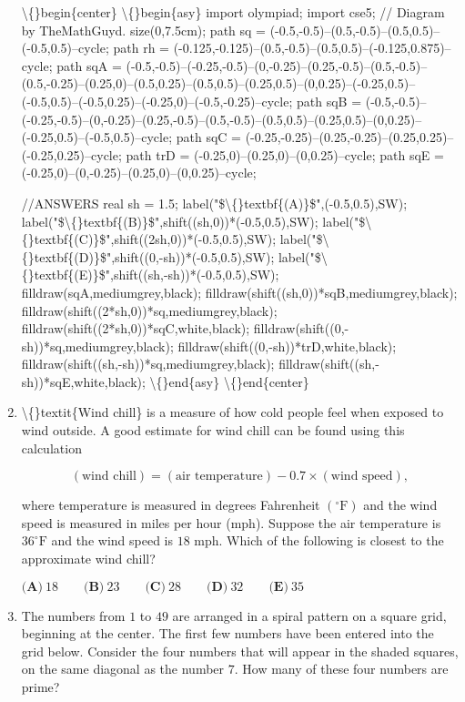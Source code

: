\documentclass{article}
\begin{document}
\begin{enumerate}[label=\arabic*., itemsep=0.5em]
\textbackslash\{\}begin\{center\}
\textbackslash\{\}begin\{asy\}
import olympiad;
import cse5;
// Diagram by TheMathGuyd.
size(0,7.5cm);
path sq = (-0.5,-0.5)--(0.5,-0.5)--(0.5,0.5)--(-0.5,0.5)--cycle;
path rh = (-0.125,-0.125)--(0.5,-0.5)--(0.5,0.5)--(-0.125,0.875)--cycle;
path sqA = (-0.5,-0.5)--(-0.25,-0.5)--(0,-0.25)--(0.25,-0.5)--(0.5,-0.5)--(0.5,-0.25)--(0.25,0)--(0.5,0.25)--(0.5,0.5)--(0.25,0.5)--(0,0.25)--(-0.25,0.5)--(-0.5,0.5)--(-0.5,0.25)--(-0.25,0)--(-0.5,-0.25)--cycle;
path sqB = (-0.5,-0.5)--(-0.25,-0.5)--(0,-0.25)--(0.25,-0.5)--(0.5,-0.5)--(0.5,0.5)--(0.25,0.5)--(0,0.25)--(-0.25,0.5)--(-0.5,0.5)--cycle;
path sqC = (-0.25,-0.25)--(0.25,-0.25)--(0.25,0.25)--(-0.25,0.25)--cycle;
path trD = (-0.25,0)--(0.25,0)--(0,0.25)--cycle;
path sqE = (-0.25,0)--(0,-0.25)--(0.25,0)--(0,0.25)--cycle;

//ANSWERS
real sh = 1.5;
label("\$\textbackslash\{\}textbf\{(A)\}\$",(-0.5,0.5),SW);
label("\$\textbackslash\{\}textbf\{(B)\}\$",shift((sh,0))*(-0.5,0.5),SW);
label("\$\textbackslash\{\}textbf\{(C)\}\$",shift((2sh,0))*(-0.5,0.5),SW);
label("\$\textbackslash\{\}textbf\{(D)\}\$",shift((0,-sh))*(-0.5,0.5),SW);
label("\$\textbackslash\{\}textbf\{(E)\}\$",shift((sh,-sh))*(-0.5,0.5),SW);
filldraw(sqA,mediumgrey,black);
filldraw(shift((sh,0))*sqB,mediumgrey,black);
filldraw(shift((2*sh,0))*sq,mediumgrey,black);
filldraw(shift((2*sh,0))*sqC,white,black);
filldraw(shift((0,-sh))*sq,mediumgrey,black);
filldraw(shift((0,-sh))*trD,white,black);
filldraw(shift((sh,-sh))*sq,mediumgrey,black);
filldraw(shift((sh,-sh))*sqE,white,black);
\textbackslash\{\}end\{asy\}
\textbackslash\{\}end\{center\}
\par \vspace{0.5em}\item \textbackslash\{\}textit\{Wind chill\} is a measure of how cold people feel when exposed to wind outside. A good estimate for wind chill can be found using this calculation

\begin{equation*}
(\text{wind chill}) = (\text{air temperature}) - 0.7 \times (\text{wind speed}),
\end{equation*}

where temperature is measured in degrees Fahrenheit \((^{\circ}\text{F})\) and the wind speed is measured in miles per hour (mph). Suppose the air temperature is \(36^{\circ}\text{F} \) and the wind speed is \(18\) mph. Which of the following is closest to the approximate wind chill?

\(\textbf{(A)}\ 18 \qquad \textbf{(B)}\ 23 \qquad \textbf{(C)}\ 28 \qquad \textbf{(D)}\ 32 \qquad \textbf{(E)}\ 35\)\par \vspace{0.5em}\item The numbers from \(1\) to \(49\) are arranged in a spiral pattern on a square grid, beginning at the center. The first few numbers have been entered into the grid below. Consider the four numbers that will appear in the shaded squares, on the same diagonal as the number \(7.\) How many of these four numbers are prime?


\end{enumerate}
\end{document}
